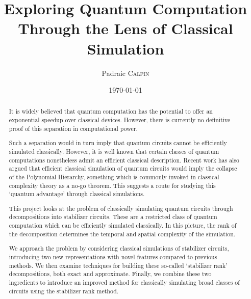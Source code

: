 

\title{Exploring Quantum Computation Through the Lens of Classical Simulation}
\author{Padraic \textsc{Calpin}}
\date{\today}

\maketitle
\makedeclaration

\begin{abstract} %
It is widely believed that quantum computation has the potential to offer an exponential speedup over classical devices. However, there is currently no definitive proof of this separation in computational power.\par
Such a separation would in turn imply that quantum circuits cannot be efficiently simulated classically. However, it is well known that certain classes of quantum computations nonetheless admit an efficient classical description. Recent work has also argued that efficient classical simulation of quantum circuits would imply the collapse of the Polynomial Hierarchy, something which is commonly invoked in classical complexity theory as a no-go theorem. This suggests a route for studying this ‘quantum advantage’ through classical simulations.\par
This project looks at the problem of classically simulating quantum circuits through decompositions into stabilizer circuits. These are a restricted class of quantum computation which can be efficiently simulated classically. In this picture, the rank of the decomposition determines the temporal and spatial complexity of the simulation.\par
We approach the problem by considering classical simulations of stabilizer circuits, introducing two new representations with novel features compared to previous methods. We then examine techniques for building these so-called ‘stabilizer rank’ decompositions, both exact and approximate.  Finally, we combine these two ingredients to introduce an improved method for classically simulating broad classes of circuits using the stabilizer rank method.
\end{abstract}

